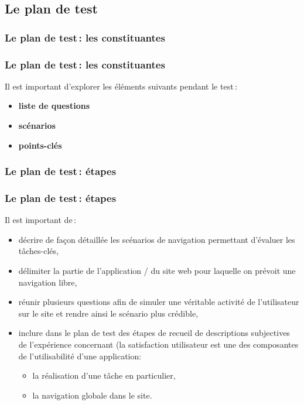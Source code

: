 		\subsection{Le plan de test}  
		\subsubsection{Le plan de test\,: les constituantes} 

		\begin{frame}[allowframebreaks]
			\frametitle{Le plan de test\,: les constituantes \citep{ergolab2014a}}
			Il est important d'explorer les éléments suivants pendant le test\,:
			\begin {itemize}
				      \item \textbf{liste de questions}
				      \item \textbf{scénarios}
				      \item \textbf{points-clés}
			\end{itemize}
		\end{frame} 

	\subsubsection{Le plan de test\,: étapes} 

		\begin{frame}[allowframebreaks]
			\frametitle{Le plan de test\,: étapes \citep{ergolab2014a}}
			Il est important de\,:
			\begin {itemize}
				      \item décrire de façon détaillée les scénarios de navigation permettant d'évaluer les tâches-clés,
				      \item délimiter la partie de l'application / du site web pour laquelle on prévoit une navigation libre,
				      \item réunir plusieurs questions afin de simuler une véritable activité de l'utilisateur sur le site et rendre ainsi le scénario plus crédible,
				      \item inclure dans le plan de test des étapes de recueil de descriptions subjectives de l'expérience concernant (la satisfaction utilisateur est une des composantes de l'utilisabilité d'une application:
				      \begin {itemize}
				     		\item la réalisation d'une tâche en particulier,
				      		\item la navigation globale dans le site.
				      	\end{itemize}
			\end{itemize}
		\end{frame}
		

